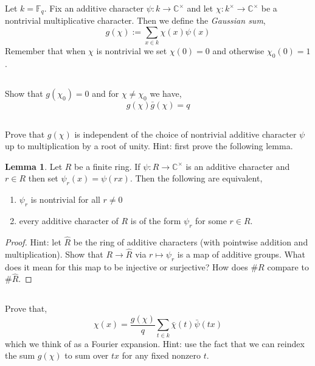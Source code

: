 \documentclass[12pt]{article}
\newcommand{\wh}[1]{\widehat{#1}}
\newcommand{\FF}{\mathbb{F}}
\newcommand{\CC}{\mathbb{C}}
\theoremstyle{remark}
\theoremstyle{definition}
\newtheorem{lemma}[theorem]{Lemma}
\begin{document}
Let $k = \FF_q$. Fix an additive character $\psi : k \to \CC^\times$ and let $\chi :  k^\times \to \CC^\times$ be a nontrivial multiplicative character. Then we define the \textit{Gaussian sum},
\[ g(\chi) := \sum_{x \in k} \chi(x) \psi(x) \]
Remember that when $\chi$ is nontrivial we set $\chi(0) = 0$ and otherwise $\chi_0(0) = 1$. 

\subsection{}

Show that $g(\chi_0) = 0$ and for $\chi \neq \chi_0$ we have,
\[ g(\chi) \bar{g}(\chi) = q \]

\subsection{}

Prove that $g(\chi)$ is independent of the choice of nontrivial additive character $\psi$ up to multiplication by a root of unity. Hint: first prove the following lemma.

\begin{lemma}
Let $R$ be a finite ring. If $\psi : R \to \CC^\times$ is an additive character and $r \in R$ then set $\psi_r(x) = \psi(rx)$. Then the following are equivalent,
\begin{enumerate}
\item $\psi_r$ is nontrivial for all $r \neq 0$
\item every additive character of $R$ is of the form $\psi_r$ for some $r \in R$.
\end{enumerate}
\end{lemma} 

\begin{proof}
Hint: let $\wh{R}$ be the ring of additive characters (with pointwise addition and multiplication). Show that $R \to \wh{R}$ via $r \mapsto \psi_r$ is a map of additive groups. What does it mean for this map to be injective or surjective? How does $\# R$ compare to $\# \wh{R}$.
\end{proof}

\subsection{}

Prove that,
\[ \chi(x) = \frac{g(\chi)}{q} \sum_{t \in k} \bar{\chi}(t) \bar{\psi}(tx) \]
which we think of as a Fourier expansion. Hint: use the fact that we can reindex the sum $g(\chi)$ to sum over $t x$ for any fixed nonzero $t$.
\end{document}
